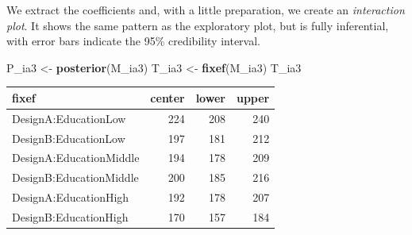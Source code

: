 \documentclass[]{svmono}
\newenvironment{Shaded}{\begin{snugshade}}{\end{snugshade}}
\newcommand{\KeywordTok}[1]{\textcolor[rgb]{0.13,0.29,0.53}{\textbf{#1}}}
\newcommand{\DataTypeTok}[1]{\textcolor[rgb]{0.13,0.29,0.53}{#1}}
\newcommand{\DecValTok}[1]{\textcolor[rgb]{0.00,0.00,0.81}{#1}}
\newcommand{\StringTok}[1]{\textcolor[rgb]{0.31,0.60,0.02}{#1}}
\newcommand{\OperatorTok}[1]{\textcolor[rgb]{0.81,0.36,0.00}{\textbf{#1}}}
\newcommand{\NormalTok}[1]{#1}
\begin{document}
We extract the coefficients and, with a little preparation, we create an
\emph{interaction plot}. It shows the same pattern as the exploratory
plot, but is fully inferential, with error bars indicate the 95\%
credibility interval.

\begin{Shaded}
\begin{Highlighting}[]
\NormalTok{P_ia3 <-}\StringTok{ }\KeywordTok{posterior}\NormalTok{(M_ia3)}
\NormalTok{T_ia3 <-}\StringTok{ }\KeywordTok{fixef}\NormalTok{(M_ia3)}
\NormalTok{T_ia3}
\end{Highlighting}
\end{Shaded}

\begin{longtable}[]{@{}lrrr@{}}
\toprule
fixef & center & lower & upper\tabularnewline
\midrule
\endhead
DesignA:EducationLow & 224 & 208 & 240\tabularnewline
DesignB:EducationLow & 197 & 181 & 212\tabularnewline
DesignA:EducationMiddle & 194 & 178 & 209\tabularnewline
DesignB:EducationMiddle & 200 & 185 & 216\tabularnewline
DesignA:EducationHigh & 192 & 178 & 207\tabularnewline
DesignB:EducationHigh & 170 & 157 & 184\tabularnewline
\bottomrule
\end{longtable}

\begin{Shaded}
\end{Shaded}
\end{document}
